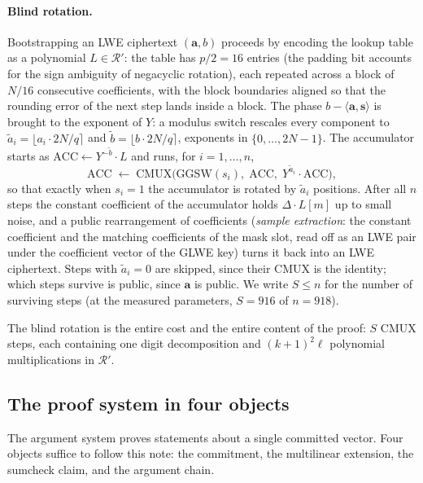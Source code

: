 \documentclass[11pt]{article}
\newcommand{\tring}{\mathcal{R}'}
\newcommand{\inner}[2]{\langle #1, #2 \rangle}
\newcommand{\ACC}{\mathrm{ACC}}
\begin{document}
\paragraph{Blind rotation.} Bootstrapping an LWE ciphertext $(\mathbf{a}, b)$ proceeds by encoding the lookup table as a polynomial $L \in \tring$: the table has $p/2 = 16$ entries (the padding bit accounts for the sign ambiguity of negacyclic rotation), each repeated across a block of $N/16$ consecutive coefficients, with the block boundaries aligned so that the rounding error of the next step lands inside a block. The phase $b - \inner{\mathbf{a}}{\mathbf{s}}$ is brought to the exponent of $Y$: a modulus switch rescales every component to $\tilde{a}_i = \lfloor a_i \cdot 2N/q \rceil$ and $\tilde{b} = \lfloor b \cdot 2N/q \rceil$, exponents in $\{0, \dots, 2N - 1\}$. The accumulator starts as $\ACC \gets Y^{-\tilde b} \cdot L$ and runs, for $i = 1, \dots, n$,
\[
  \ACC \;\gets\; \mathrm{CMUX}\bigl(\mathrm{GGSW}(s_i),\; \ACC,\; Y^{\tilde a_i} \cdot \ACC\bigr),
\]
so that exactly when $s_i = 1$ the accumulator is rotated by $\tilde a_i$ positions. After all $n$ steps the constant coefficient of the accumulator holds $\Delta \cdot L[m]$ up to small noise, and a public rearrangement of coefficients (\emph{sample extraction}: the constant coefficient and the matching coefficients of the mask slot, read off as an LWE pair under the coefficient vector of the GLWE key) turns it back into an LWE ciphertext. Steps with $\tilde a_i = 0$ are skipped, since their CMUX is the identity; which steps survive is public, since $\mathbf{a}$ is public. We write $S \le n$ for the number of surviving steps (at the measured parameters, $S = 916$ of $n = 918$).

The blind rotation is the entire cost and the entire content of the proof: $S$ CMUX steps, each containing one digit decomposition and $(k+1)^2 \ell$ polynomial multiplications in $\tring$.

\subsection{The proof system in four objects}\label{sec:snark}

The argument system \cite{rokoko} proves statements about a single committed vector. Four objects suffice to follow this note: the commitment, the multilinear extension, the sumcheck claim, and the argument chain.
\end{document}

